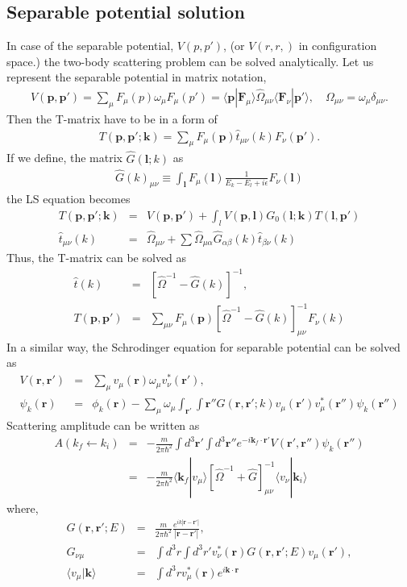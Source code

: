 \documentclass[10pt]{book}
\def\bm{\boldsymbol}
\newcommand{\bea}{\begin{eqnarray}}
\newcommand{\eea}{\end{eqnarray}}
\newcommand{\no}{\nonumber \\}
\def\vp{{\bm p}}
\def\vk{{\bm k}}
\def\vl{{\bm l}}
\def\vr{{\bm r}}
\def\la{\langle}
\def\ra{\rangle}
\begin{document}
 

\subsection{Separable potential solution}
In case of the separable potential, $V(p,p')$,
(or $V(r,r,)$ in configuration space.) 
the two-body scattering problem can be solved analytically.
Let us represent the separable potential in matrix notation,
\bea
V(\vp,\vp')=\sum_\mu F_\mu(p)\omega_\mu F_\mu(p')
       =\la \vp|{\bm F}_\mu\ra \hat{\Omega}_{\mu\nu}\la {\bm F}_\nu|\vp'\ra,
       \quad \Omega_{\mu\nu}=\omega_\mu\delta_{\mu\nu} .
\eea 
Then the T-matrix 
have to be in a form of
\bea
T(\vp,\vp';\vk)=\sum_\mu F_\mu(\vp) \hat{t}_{\mu\nu}(k) F_\nu(\vp').
\eea
If we define, the matrix $\hat{G}(\vl; k)$ as
\bea
\hat{G}(k)_{\mu\nu}\equiv
\int_{\vl} F_\mu(\vl)\frac{1}{E_k-E_l+i\epsilon} F_\nu(\vl)
\eea
the LS equation becomes
\bea
T(\vp,\vp';\vk)&=&
V(\vp,\vp')+\int_{l} V(\vp,\vl)G_0(\vl;\vk)T(\vl,\vp')\no
\hat{t}_{\mu\nu}(k)
&=& \hat{\Omega}_{\mu\nu}
+\sum \hat{\Omega}_{\mu\alpha}
 \hat{G}_{\alpha\beta}(k)
 \hat{t}_{\beta\nu}(k)
\eea
Thus, the T-matrix can be solved as
\bea
\hat{t}(k)&=&[\hat{\Omega}^{-1}-\hat{G}(k)]^{-1},\no 
T(\vp,\vp')&=&\sum_{\mu\nu} F_\mu(\vp)\left[\hat{\Omega}^{-1}-\hat{G}(k)\right]^{-1}_{\mu\nu}
F_{\nu}(k)
\eea
In a similar way, the Schrodinger equation for separable potential
can be solved as
\bea
V(\vr,\vr')&=&\sum_\mu v_\mu(\vr) \omega_\mu v^*_\nu(\vr'),\no
\psi_k(\vr)&=&\phi_k(\vr)
           -\sum_\mu \omega_\mu 
           \int_{\vr'}\int{\vr''} G(\vr,\vr';k) v_\mu(\vr')
            v_\mu^*(\vr'')\psi_k(\vr'')
\eea
Scattering amplitude can be written as
\bea
A(k_f\leftarrow k_i)
&=&-\frac{m}{2\pi\hbar^2}\int d^3\vr'\int d^3\vr''
  e^{-i\vk_f\cdot\vr'} V(\vr',\vr'')\psi_k(\vr'') \no
&=&-\frac{m}{2\pi\hbar^2}
   \la \vk_f|v_\mu\ra \left[\hat{\Omega}^{-1}+\hat{G} \right]^{-1}_{\mu\nu}\la v_\nu|\vk_i\ra
\eea
where,
\bea
G(\vr,\vr';E)&=&\frac{m}{2\pi\hbar^2}
                \frac{e^{ik|\vr-\vr'|}}{|\vr-\vr'|},\no
G_{\nu\mu}&=&\int d^3 r\int d^3 r'
            v_\nu^*(\vr) G(\vr,\vr';E) v_\mu(\vr') ,\no
\la v_\mu|\vk\ra&=&\int d^3 r 
v_\mu^*(\vr)e^{i\vk\cdot\vr}                             
\eea
\end{document}
